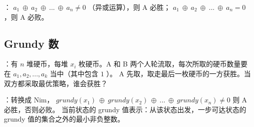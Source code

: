 \documentclass[letterpaper,10pt,english]{sphinxmanual}
\begin{document}
 ： \(a_1\ \oplus\ a_2\ \oplus\ ...\ \oplus\ a_n \ne 0\) （异或运算），则 A 必胜； \(a_1\ \oplus\ a_2\ \oplus\ ...\ \oplus\ a_n = 0\) ，则 A 必败。


\subsection{Grundy 数}
\label{\detokenize{mathematicsAlgorithm/05_game:grundy}}
 ：有 \(n\) 堆硬币，每堆 \(x_i\) 枚硬币。A 和 B 两个人轮流取，每次所取的硬币数量要在 \(a_1, a_2,...,a_k\) 当中（其中包含 \(1\) ）。
A 先取，取走最后一枚硬币的一方获胜。当双方都采取最优策略，谁会获胜？

 ：转换成 Nim， \(grundy(x_1)\ \oplus\ grundy(x_2)\ \oplus\ ...\ \oplus\ grundy(x_n) \ne 0\) 则 A 必胜，否则必败。
当前状态的 grundy 值表示：从该状态出发，一步可达状态的 grundy 值的集合之外的最小非负整数。
\end{document}
